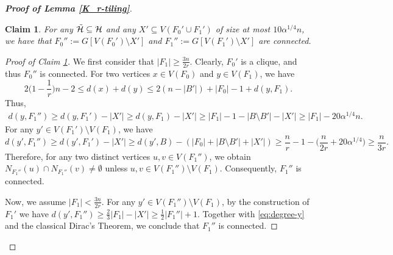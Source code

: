 \documentclass[11pt, a4paper]{article}
\newtheorem{claim}[theorem]{Claim}
\theoremstyle{definition}
\newcommand{\<}{\subseteq}
\begin{document}
\begin{proof}[\bf Proof of Lemma \ref{K_r-tiling}]
\begin{claim}\label{Connected}
For any $\Tilde{\mathcal{H}}\subseteq \mathcal{H}$ and any $X'\subseteq V(F_0'\cup F_1')$ of size at most $10\alpha^{1/4}n$, we have that $F_0'':=G[V(F_0')\setminus X']$ and $F_1'':=G[V(F_1')\setminus X']$ are connected.
\end{claim}
\begin{proof}[Proof of Claim \ref{Connected}]
   We first consider that $|F_1|\ge \frac{3n}{2r}$. %
   Clearly, $F_0'$ is a clique, and thus $F_0''$ is connected. %
For two vertices $x\in V(F_0)$ and $y\in V(F_1)$, we have
$$
2\Big(1-\frac{1}{r}\Big)n-2\leq d(x)+d(y)\leq 2(n-|B'|)+|F_0|-1+d(y,F_1).
$$
Thus, 
\begin{align}\label{eq:degree-y}    
d(y,F_1'')\geq d(y,F_1')-|X'|\geq d(y,F_1)-|X'|\geq |F_1|-1-|B\setminus B'|-|X'|\geq |F_1|-20\alpha^{1/4}n. 
\end{align}
    For any $y'\in V(F_1')\setminus V(F_1)$, we have
    $$ 
    d(y',F_1'')\ge d(y',F_1')-|X'|\geq d(y',B)-(|F_0|+|B\setminus B'|+|X'|)\ge \frac{n}{r}-1-\big(\frac{n}{2r}+20\alpha^{1/4}\big)\geq \frac{n}{3r}.
    $$
    Therefore, for any two distinct vertices $u,v\in V(F_1'')$, we obtain $N_{F_1''}(u)\cap N_{F_1''}(v)\neq \emptyset$ unless $u,v\in V(F_1'')\setminus V(F_1)$. Consequently, $F_1''$ is connected. 

    Now, we assume  $|F_1|<\frac{3n}{2r}$. For any $y'\in V(F_1'')\setminus V(F_1)$, by the construction of $F_1'$ we have $d(y',F_1'')\ge \frac{2}{3}|F_1|-|X'|\geq \frac{1}{2}|F_1''|+1$. Together with \eqref{eq:degree-y} and the classical Dirac's Theorem, we conclude that %
    $F_1''$ is connected.
    

\end{proof}
\end{proof}
\end{document}
